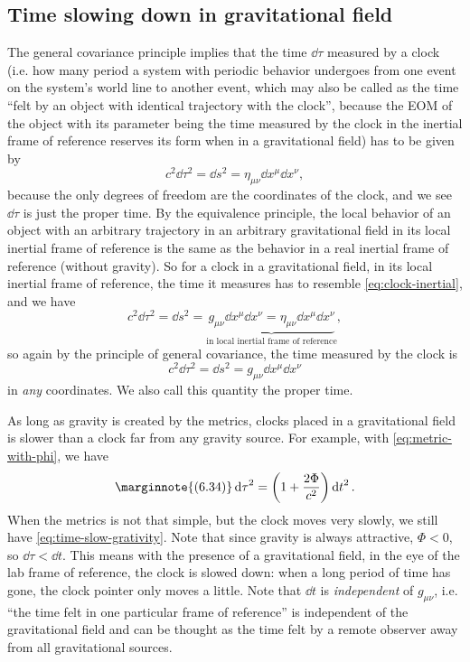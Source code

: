 \documentclass[hyperref, a4paper]{article}
\begin{document}
\subsection{Time slowing down in gravitational field}

The general covariance principle implies that the time $\dd \tau$ measured by a 
clock (i.e. how many period a system with periodic behavior undergoes from one event on the system's world 
line to another event, which may also be called as the time ``felt by an object with identical trajectory 
with the clock'', because the EOM of the object with its parameter being the time measured by the clock in 
the inertial frame of reference reserves its form when in a gravitational field) has to be given by 
\begin{equation}
    c^2 \dd{\tau}^2 = \dd{s^2} = \eta_{\mu \nu} \dd{x^\mu} \dd{x^\nu},
    \label{eq:clock-inertial}
\end{equation}
because the only degrees of freedom are the coordinates of the clock, and we see $\dd{\tau}$ is just the proper time. 
By the equivalence principle, the local behavior of an object with an arbitrary trajectory in an arbitrary
gravitational field in its local inertial frame of reference is the same as the behavior in a real inertial 
frame of reference (without gravity). So for a clock in a gravitational field, in its local inertial frame 
of reference, the time it measures has to resemble \eqref{eq:clock-inertial}, and we have 
\[
    c^2 \dd{\tau^2} = \dd{s^2} = \underbrace{g_{\mu \nu} \dd{x^\mu} \dd{x^\nu} = \eta_{\mu \nu} \dd{x^\mu} \dd{x^\nu} }_{\text{in local inertial frame of reference}},
\]
so again by the principle of general covariance, the time measured by the clock is 
\begin{equation}
    c^2 \dd{\tau^2} = \dd{s^2} = g_{\mu \nu} \dd{x^\mu} \dd{x^\nu}
\end{equation}
in \emph{any} coordinates. We also call this quantity the proper time.

As long as gravity is created by the metrics, clocks placed in a gravitational field is slower than a clock 
far from any gravity source. For example, with \eqref{eq:metric-with-phi}, we have 
\begin{equation} \marginnote{(6.34)}
    \dd{\tau}^2 = \left(1 + \frac{2 \Phi}{c^2} \right) \dd{t}^2. \label{eq:time-slow-grativity}
\end{equation} 
When the metrics is not that simple, but the clock moves very slowly, we still have \eqref{eq:time-slow-grativity}.
Note that since gravity is always attractive, $\Phi < 0$, so $\dd{\tau} < \dd{t}$. This means with the 
presence of a gravitational field, in the eye of the lab frame of reference, the clock is slowed down:
when a long period of time has gone, the clock pointer only moves a little.
Note that $\dd{t}$ is \emph{independent} of $g_{\mu \nu}$, i.e. ``the time felt in one particular frame of reference''
is independent of the gravitational field and can be thought as the time felt by a remote observer away from 
all gravitational sources.
\end{document}
